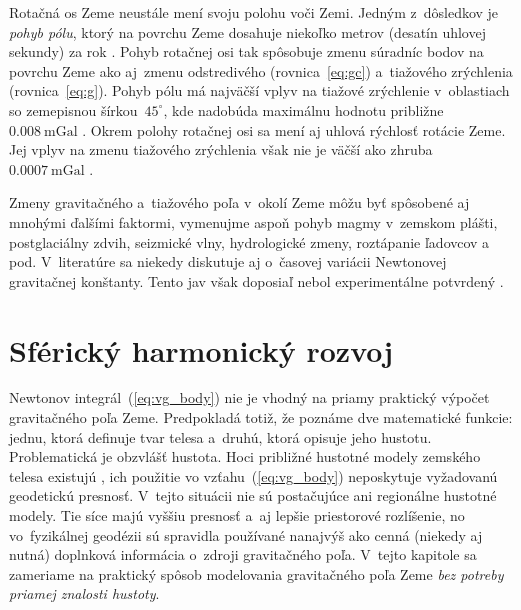 \documentclass[a4paper, 12pt]{book}
\begin{document}
Rotačná os Zeme neustále mení svoju polohu voči Zemi.  Jedným z~dôsledkov je 
\emph{pohyb pólu}, ktorý na povrchu Zeme dosahuje niekoľko metrov (desatín 
uhlovej sekundy) za rok \parencite{MoritzPhysicalGeodesy}.  Pohyb rotačnej osi 
tak spôsobuje zmenu súradníc bodov na povrchu Zeme ako aj~zmenu odstredivého 
(rovnica~\ref{eq:gc}) a~tiažového zrýchlenia (rovnica~\ref{eq:g}).  Pohyb pólu 
má najväčší vplyv na tiažové zrýchlenie v~oblastiach so zemepisnou 
šírkou~$45^{\circ}$, kde nadobúda maximálnu hodnotu približne~$0.008\ 
\mathrm{mGal}$ \parencite{Torge1989}.  Okrem polohy rotačnej osi sa mení aj 
uhlová rýchlosť rotácie Zeme.  Jej vplyv na zmenu tiažového zrýchlenia však nie 
je väčší ako zhruba~$0.0007\ \mathrm{mGal}$ \parencite{Torge1989}.

Zmeny gravitačného a~tiažového poľa v~okolí Zeme môžu byť spôsobené aj mnohými 
ďalšími faktormi, vymenujme aspoň pohyb magmy v~zemskom plášti, postglaciálny 
zdvih, seizmické vlny, hydrologické zmeny, roztápanie ľadovcov a pod.  
V~literatúre sa niekedy diskutuje aj o~časovej variácii Newtonovej gravitačnej 
konštanty.  Tento jav však doposiaľ nebol experimentálne potvrdený 
\parencite{Torge1989}.







\chapter{Sférický harmonický rozvoj}
\label{sec:spherical_harmonic_expansion}

Newtonov integrál~(\ref{eq:vg_body}) nie je vhodný na priamy praktický výpočet 
gravitačného poľa Zeme.  Predpokladá totiž, že poznáme dve matematické funkcie: 
jednu, ktorá definuje tvar telesa a~druhú, ktorá opisuje jeho hustotu.  
Problematická je obzvlášť hustota.  Hoci približné hustotné modely zemského 
telesa existujú \parencite[napríklad][]{Dziewonski1981}, ich použitie vo 
vzťahu~(\ref{eq:vg_body}) neposkytuje vyžadovanú geodetickú presnosť.  V~tejto 
situácii nie sú postačujúce ani regionálne hustotné modely.  Tie síce majú 
vyššiu presnosť a~aj lepšie priestorové rozlíšenie, no vo~fyzikálnej geodézii 
sú spravidla používané nanajvýš ako cenná (niekedy aj nutná) doplnková 
informácia o~zdroji gravitačného poľa.  V~tejto kapitole sa zameriame na 
praktický spôsob modelovania gravitačného poľa Zeme \emph{bez potreby priamej 
znalosti hustoty}.
\end{document}
